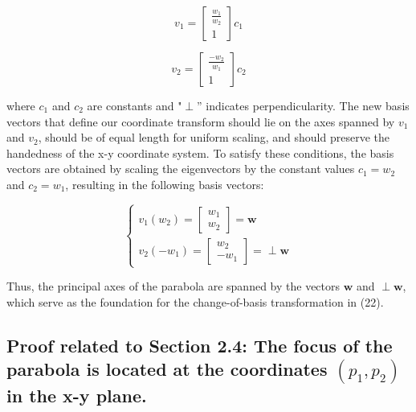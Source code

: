 \documentclass[11pt]{article}
\newcommand{\bs}[1]{\boldsymbol{#1}} %
\begin{document}
        \begin{equation}
            v_1 = \begin{bmatrix} \frac{w_1}{w_2} \\ 1 \end{bmatrix} c_1
            \label{eq:Eq51}
        \end{equation}
        
        \begin{equation}
            v_2 = \begin{bmatrix} \frac{-w_2}{w_1} \\ 1 \end{bmatrix} c_2
            \label{eq:Eq52}
        \end{equation}
    
        where $c_1$ and $c_2$ are constants and "$\perp$” indicates perpendicularity. The new basis vectors that define our coordinate transform should lie on the axes spanned by $v_1$ and $v_2$, should be of equal length for uniform scaling, and should preserve the handedness of the x-y coordinate system. To satisfy these conditions, the basis vectors are obtained by scaling the eigenvectors by the constant values $c_1 = w_2$ and $c_2 = w_1$, resulting in the following basis vectors: 

        \begin{equation}
            \left\{ \begin{array}{l}    v_1(w_2) = \begin{bmatrix} w_1 \\ w_2 \end{bmatrix} = \bs{w} \\ 
                                        v_2(-w_1) = \begin{bmatrix} w_2 \\ -w_1 \end{bmatrix} = \perp\bs{w} \end{array}\right.
            \label{eq:Eq53}
        \end{equation}
    
        Thus, the principal axes of the parabola are spanned by the vectors $\bs{w}$ and $\perp\bs{w}$, which serve as the foundation for the change-of-basis transformation in (22).
        
    \subsection{Proof related to Section 2.4: The focus of the parabola is located at the coordinates $(p_1,p_2)$ in the x-y plane.}
\end{document}

